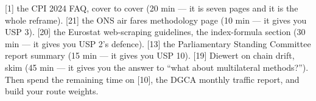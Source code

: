 \begin{keybox}
 [1] the CPI 2024 FAQ, cover to cover
(20 min --- it is seven pages and it is the whole reframe). [21] the ONS air fares
methodology page (10 min --- it gives you USP 3). [20] the Eurostat web-scraping guidelines,
the index-formula section (30 min --- it gives you USP 2's defence). [13] the Parliamentary
Standing Committee report summary (15 min --- it gives you USP 10). [19] Diewert on chain
drift, skim (45 min --- it gives you the answer to ``what about multilateral methods?'').
Then spend the remaining time on [10], the DGCA monthly traffic report, and build your route
weights.
\end{keybox}
